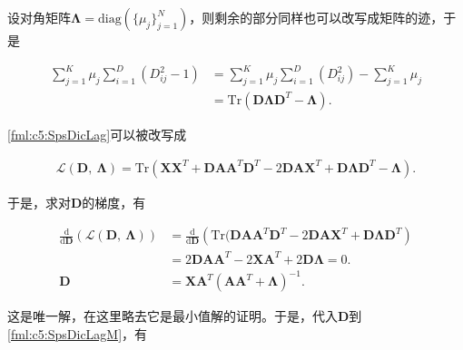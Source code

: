 设对角矩阵$\bm{\Lambda}=\mathrm{diag}(\{\mu_j\}_{j=1}^N)$，则剩余的部分同样也可以改写成矩阵的迹，于是

\begin{equation}\label{fml:c5:SpsDicLag2}
	\begin{aligned}
		\sum_{j=1}^{K}\mu_j\sum_{i=1}^{D}(D_{ij}^2-1) &= \sum_{j=1}^{K}\mu_j\sum_{i=1}^{D}(D_{ij}^2) - \sum_{j=1}^{K}\mu_j\\
		&= \mathrm{Tr}(\mathbf{D}\bm{\Lambda}\mathbf{D}^T - \bm{\Lambda}).
	\end{aligned}
\end{equation}

\eqref{fml:c5:SpsDicLag}可以被改写成

\begin{equation}\label{fml:c5:SpsDicLagM}
	\begin{aligned}
		\mathcal{L}(\mathbf{D},~\bm{\Lambda}) = \mathrm{Tr}(\mathbf{X}\mathbf{X}^T + \mathbf{D}\mathbf{A}\mathbf{A}^T\mathbf{D}^T -  2\mathbf{D}\mathbf{A}\mathbf{X}^T + \mathbf{D}\bm{\Lambda}\mathbf{D}^T - \bm{\Lambda}).
	\end{aligned}
\end{equation}

于是，求对$\mathbf{D}$的梯度，有

\begin{equation}\label{fml:c5:SpsDicLagMGrad}
	\begin{aligned}
		\frac{\mathrm{d}}{\mathrm{d}\mathbf{D}} \left( \mathcal{L}(\mathbf{D},~\bm{\Lambda}) \right) &= \frac{\mathrm{d}}{\mathrm{d}\mathbf{D}} \left( \mathrm{Tr}( \mathbf{D}\mathbf{A}\mathbf{A}^T\mathbf{D}^T -  2\mathbf{D}\mathbf{A}\mathbf{X}^T + \mathbf{D}\bm{\Lambda}\mathbf{D}^T \right)\\
		&= 2\mathbf{D}\mathbf{A}\mathbf{A}^T - 2\mathbf{X}\mathbf{A}^T + 2\mathbf{D}\bm{\Lambda} = 0.\\
		\mathbf{D} &= \mathbf{X}\mathbf{A}^T(\mathbf{A}\mathbf{A}^T+\bm{\Lambda})^{-1}.
	\end{aligned}
\end{equation}

这是唯一解，在这里略去它是最小值解的证明。于是，代入$\mathbf{D}$到\eqref{fml:c5:SpsDicLagM}，有


